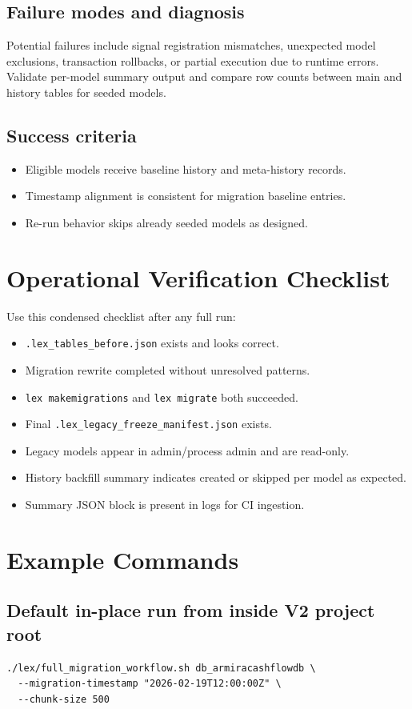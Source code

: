 \documentclass[11pt,a4paper]{article}
\begin{document}
\subsection*{Failure modes and diagnosis}
Potential failures include signal registration mismatches, unexpected model exclusions,
transaction rollbacks, or partial execution due to runtime errors. Validate per-model summary
output and compare row counts between main and history tables for seeded models.

\subsection*{Success criteria}
\begin{itemize}[leftmargin=1.5em]
  \item Eligible models receive baseline history and meta-history records.
  \item Timestamp alignment is consistent for migration baseline entries.
  \item Re-run behavior skips already seeded models as designed.
\end{itemize}

\newpage
\section{Operational Verification Checklist}
Use this condensed checklist after any full run:
\begin{itemize}[leftmargin=1.5em]
  \item \texttt{.lex\_tables\_before.json} exists and looks correct.
  \item Migration rewrite completed without unresolved patterns.
  \item \texttt{lex makemigrations} and \texttt{lex migrate} both succeeded.
  \item Final \texttt{.lex\_legacy\_freeze\_manifest.json} exists.
  \item Legacy models appear in admin/process admin and are read-only.
  \item History backfill summary indicates created or skipped per model as expected.
  \item Summary JSON block is present in logs for CI ingestion.
\end{itemize}

\section{Example Commands}
\subsection*{Default in-place run from inside V2 project root}
\begin{verbatim}
./lex/full_migration_workflow.sh db_armiracashflowdb \
  --migration-timestamp "2026-02-19T12:00:00Z" \
  --chunk-size 500
\end{verbatim}
\end{document}
